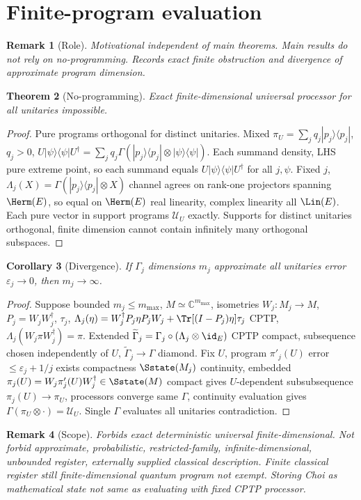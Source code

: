 \documentclass[11pt,a4paper]{article}
\newtheorem{theorem}{Theorem}[section]
\newtheorem{corollary}[theorem]{Corollary}
\newtheorem{remark}[theorem]{Remark}
\begin{document}
\section{Finite-program evaluation}
\begin{remark}[Role]
Motivational independent of main theorems. Main results do not rely on no-programming. Records exact finite obstruction and divergence of approximate program dimension.
\end{remark}
\begin{theorem}[No-programming]
Exact finite-dimensional universal processor for all unitaries impossible.
\end{theorem}
\begin{proof}
Pure programs orthogonal for distinct unitaries. Mixed $\pi_U=\sum_jq_j|p_j\rangle\langle p_j|$, $q_j>0$, $U|\psi\rangle\langle\psi|U^\dagger=\sum_jq_j\Gamma(|p_j\rangle\langle p_j|\otimes|\psi\rangle\langle\psi|)$. Each summand density, LHS pure extreme point, so each summand equals $U|\psi\rangle\langle\psi|U^\dagger$ for all $j,\psi$. Fixed $j$, $\Lambda_j(X)=\Gamma(|p_j\rangle\langle p_j|\otimes X)$ channel agrees on rank-one projectors spanning $\Herm(E)$, so equal on $\Herm(E)$ real linearity, complex linearity all $\Lin(E)$. Each pure vector in support programs $\mathcal U_U$ exactly. Supports for distinct unitaries orthogonal, finite dimension cannot contain infinitely many orthogonal subspaces.
\end{proof}
\begin{corollary}[Divergence]
If $\Gamma_j$ dimensions $m_j$ approximate all unitaries error $\varepsilon_j\to0$, then $m_j\to\infty$.
\end{corollary}
\begin{proof}
Suppose bounded $m_j\le m_{\max}$, $M\simeq\mathbb C^{m_{\max}}$, isometries $W_j:M_j\to M$, $P_j=W_jW_j^\dagger$, $\tau_j$, $\Lambda_j(\eta)=W_j^\dagger P_j\eta P_jW_j+\Tr[(I-P_j)\eta]\tau_j$ CPTP, $\Lambda_j(W_j\pi W_j^\dagger)=\pi$. Extended $\widetilde\Gamma_j=\Gamma_j\circ(\Lambda_j\otimes\id_E)$ CPTP compact, subsequence chosen independently of $U$, $\widetilde\Gamma_j\to\Gamma$ diamond. Fix $U$, program $\pi'_j(U)$ error $\le\varepsilon_j+1/j$ exists compactness $\Sstate(M_j)$ continuity, embedded $\pi_j(U)=W_j\pi'_j(U)W_j^\dagger\in\Sstate(M)$ compact gives $U$-dependent subsubsequence $\pi_j(U)\to\pi_U$, processors converge same $\Gamma$, continuity evaluation gives $\Gamma(\pi_U\otimes\cdot)=\mathcal U_U$. Single $\Gamma$ evaluates all unitaries contradiction.
\end{proof}
\begin{remark}[Scope]
Forbids exact deterministic universal finite-dimensional. Not forbid approximate, probabilistic, restricted-family, infinite-dimensional, unbounded register, externally supplied classical description. Finite classical register still finite-dimensional quantum program not exempt. Storing Choi as mathematical state not same as evaluating with fixed CPTP processor.
\end{remark}
\end{document}
